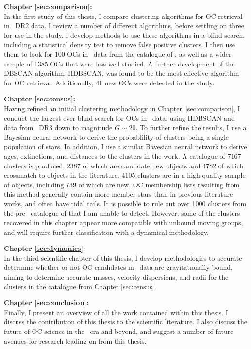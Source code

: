 \textbf{Chapter \ref{sec:comparison}: } \\[0.2em]
In the first study of this thesis, I compare clustering algorithms for OC retrieval in \gaia\ DR2 data. I review a number of different algorithms, before settling on three for use in the study. I develop methods to use these algorithms in a blind search, including a statistical density test to remove false positive clusters. I then use them to look for 100 OCs in \gaia\ data from the catalogue of \cite{kharchenko_global_2013}, as well as a wider sample of 1385 OCs that were less well studied. A further development of the DBSCAN algorithm, HDBSCAN, was found to be the most effective algorithm for OC retrieval. Additionally, 41 new OCs were detected in the study.

\textbf{Chapter \ref{sec:census}: } \\[0.2em]
Having refined an initial clustering methodology in Chapter~\ref{sec:comparison}, I conduct the largest ever blind search for OCs in \gaia\ data, using HDBSCAN and data from \gaia\ DR3 down to magnitude $G\sim20$. To further refine the results, I use a Bayesian neural network to derive the probablility of clusters being a single population of stars. In addition, I use a similar Bayesian neural network to derive ages, extinctions, and distances to the clusters in the work. A catalogue of 7167 clusters is produced, 2387 of which are candidate new objects and 4782 of which crossmatch to objects in the literature. 4105 clusters are in a high-quality sample of objects, including 739 of which are new. OC membership lists resulting from this method generally contain more member stars than in previous literature works, and often have tidal tails. It is possible to rule out over 1000 clusters from the pre-\gaia\ catalogue of \cite{kharchenko_global_2013} that I am unable to detect. However, some of the clusters recovered in this chapter appear more compatible with unbound moving groups, and will require further classification with a dynamical methodology.

\textbf{Chapter \ref{sec:dynamics}: } \\[0.2em]
In the third scientific chapter of this thesis, I develop methodologies to accurate determine whether or not OC candidates in \gaia\ data are gravitationally bound, aiming to determine accurate masses, velocity dispersions, and radii for the clusters in the catalogue from Chapter \ref{sec:census}. 

\textbf{Chapter \ref{sec:conclusion}: } \\[0.2em]

Finally, I present an overview of all the work contained within this thesis. I discuss the contribution of this thesis to the scientific literature. I also discuss the future of OC science in the \gaia\ era and beyond, and  suggest a number of future avenues for research leading on from this thesis.




